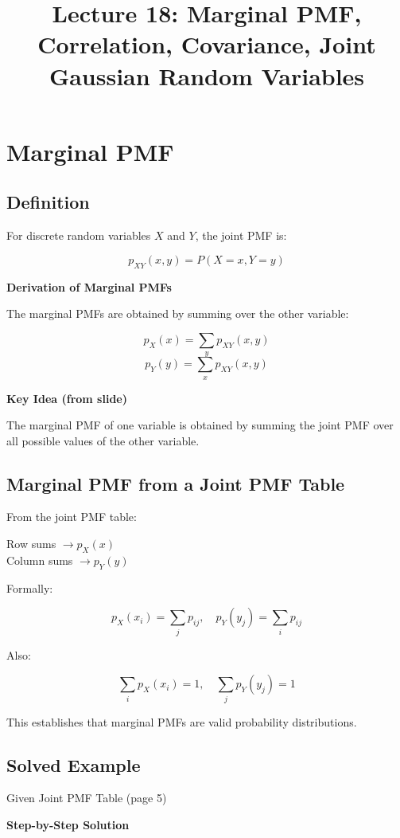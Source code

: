 \documentclass[12pt]{article}
\title{Lecture 18: Marginal PMF, Correlation, Covariance, Joint Gaussian Random Variables}
\date{}
\begin{document}
\maketitle

\section{Marginal PMF}

\subsection{Definition}

For discrete random variables $X$ and $Y$, the joint PMF is:

\[
p_{XY}(x, y) = P(X = x, Y = y)
\]

\textbf{Derivation of Marginal PMFs}

The marginal PMFs are obtained by summing over the other variable:

\[
p_X(x) = \sum_{y} p_{XY}(x, y)
\]
\[
p_Y(y) = \sum_{x} p_{XY}(x, y)
\]

\textbf{Key Idea (from slide)}

The marginal PMF of one variable is obtained by summing the joint PMF over all possible values of the other variable.

\subsection{Marginal PMF from a Joint PMF Table}

From the joint PMF table:

Row sums $\rightarrow p_X(x)$ \\
Column sums $\rightarrow p_Y(y)$

Formally:

\[
p_X(x_i) = \sum_j p_{ij}, \quad p_Y(y_j) = \sum_i p_{ij}
\]

Also:

\[
\sum_i p_X(x_i) = 1, \quad \sum_j p_Y(y_j) = 1
\]

This establishes that marginal PMFs are valid probability distributions.

\subsection{Solved Example}

Given Joint PMF Table (page 5)

\textbf{Step-by-Step Solution}
\end{document}
